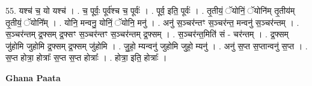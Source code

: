 \documentclass[17pt]{extarticle}
\begin{document}
55. यश्च॑ च॒ यो यश्च॑ । . च॒ पूर्वः॒ पूर्व॑श्च च॒ पूर्वः॑ । . पूर्व॒ इति॒ पूर्वः॑ । . तृ॒तीयं॒ ॅयोनिं॒ ॅयोनि॑म् तृ॒तीय॑म् तृ॒तीयं॒ ॅयोनि᳚म् । . योनि॒ मन्वनु॒ योनिं॒ ॅयोनि॒ मनु॑ । . अनु॑ स॒ञ्चर॑न्तꣳ स॒ञ्चर॑न्त॒ मन्वनु॑ स॒ञ्चर॑न्तम् । . स॒ञ्चर॑न्तम् द्र॒फ्सम् द्र॒फ्सꣳ स॒ञ्चर॑न्तꣳ स॒ञ्चर॑न्तम् द्र॒फ्सम् । . स॒ञ्चर॑न्त॒मिति॑ सं - चर॑न्तम् । . द्र॒फ्सम् जु॑होमि जुहोमि द्र॒फ्सम् द्र॒फ्सम् जु॑होमि । . जु॒हो॒ म्यन्वनु॑ जुहोमि जुहो॒ म्यनु॑ । . अनु॑ स॒प्त स॒प्तान्वनु॑ स॒प्त । . स॒प्त होत्रा॒ होत्राः᳚ स॒प्त स॒प्त होत्राः᳚ । . होत्रा॒ इति॒ होत्राः᳚ । \newline

\textbf{Ghana Paata } \newline
\end{document}
